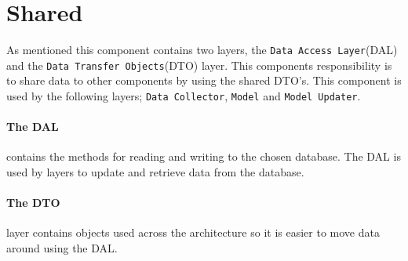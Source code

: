 \section{Shared}
As mentioned this component contains two layers, the \texttt{Data Access Layer}(DAL) and the \texttt{Data Transfer Objects}(DTO) layer.
This components responsibility is to share data to other components by using the shared DTO's.
This component is used by the following layers; \texttt{Data Collector}, \texttt{Model} and \texttt{Model Updater}.

\paragraph{The DAL} contains the methods for reading and writing to the chosen database.
The DAL is used by layers to update and retrieve data from the database.

\paragraph{The DTO} layer contains objects used across the architecture so it is easier to move data around using the DAL.